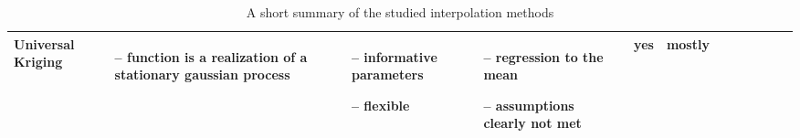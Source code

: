 \begin{table}[!ht]
\begin{tabular}{p{1.6cm}p{3.3cm}p{3.3cm}p{3.3cm}p{0.4cm}p{0.4cm}p{3cm}p{3cm}p{3cm}p{3cm}p{3cm}p{3cm}|}
		Universal Kriging                                                                                                                                            &
		\begin{cptitemize} \item[--]  function is a realization of a stationary gaussian process                                      \end{cptitemize}               &
		\begin{cptitemize} \item[--]  informative parameters \item[--]  flexible                                                             \end{cptitemize}        &
		\begin{cptitemize} \item[--]  regression to the mean \item[--]  assumptions clearly not met                                          \end{cptitemize}        &
		yes                                                                                                                                                          &
		mostly                                                                                                                                                         \\ \hline%


		\hline
	\end{tabular}
	\caption{A short summary of the studied interpolation methods}
	\label{table:pros_cons_overview}
\end{table}

